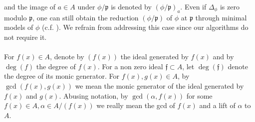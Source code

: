 \documentclass{article}
\theoremstyle{plain}
\theoremstyle{definition}
\def\F{\ensuremath{\mathbb{F}}}
\newcommand{\ph}{(\phi/\p)}
\newcommand{\p}{\mathfrak p}
\newcommand{\f}{\mathfrak f}
\begin{document}
and the image of $a \in A$ under $\phi/\p$ is denoted by $(\phi/\p)_a$. Even if $\Delta_{\phi}$ is zero modulo $\p$, one can still obtain the reduction $(\phi/\p)$ of $\phi$ at $\p$ through minimal models of $\phi$ (c.f. \cite{gek1}). We refrain from addressing this case since our algorithms do not require it.\\ \\
For $f(x) \in A$, denote by $(f(x))$ the ideal generated by $f(x)$ and by $\deg(f)$ the degree of $f(x)$. For a non zero ideal $\f \subset A$, let $\deg(\f)$ denote the degree of its monic generator. For $f(x),g(x) \in A$, by $\gcd(f(x),g(x))$ we mean the monic generator of the ideal generated by $f(x)$ and $g(x)$. Abusing notation, by $\gcd(\alpha,f(x))$ for some $f(x) \in A, \alpha \in A/(f(x))$ we really mean the gcd of $f(x)$ and a lift of $\alpha$ to $A$.
\end{document}
